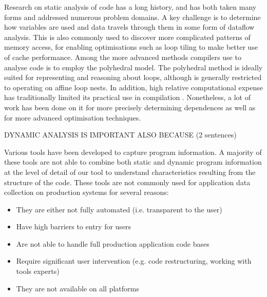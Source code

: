 Research on static analysis of code has a long history, and has both taken many forms and addressed numerous problem domains\cite{Andrade:2012:SAW:2355585.2355593}\cite{1194988}.
A key challenge is to determine how variables are used and data travels through them in some form of dataflow analysis\cite{Feautrier1991}.
This is also commonly used to discover more complicated patterns of memory access, for enabling optimisations such as loop tiling to make better use of cache performance.
Among the more advanced methods compilers use to analyse code is to employ the polyhedral model\cite{Cousot:1978:ADL:512760.512770}\cite{Bagnara:2009:APC:1628316.1628385}\cite{benabderrahmane.10.cc}.
The polyhedral method is ideally suited for representing and reasoning about loops, although is generally restricted to operating on affine loop nests. 
In addition, high relative computational expense has traditionally limited its practical use in compilation \cite{DBLP:journals/entcs/Simon10a}.
Nonetheless, a lot of work has been done on it for more precisely determining dependences \cite{Vasilache:2006:VDA:1183401.1183448} as well as for more advanced optimisation techniques\cite{Nieuwenhuizen2014AutovectorizationUP}\cite{5260526}.

DYNAMIC ANALYSIS IS IMPORTANT ALSO BECAUSE (2 sentences)


Various tools have been developed to capture program information. A majority of these tools are not able to combine both static and dynamic program information at the level of detail of our tool to understand characteristics resulting from the structure of the code. These tools are not commonly used for application data collection on production systems for several reasons:
\begin{itemize}
\item They are either not fully automated (i.e. transparent to the user)
\item Have high barriers to entry for users
\item Are not able to handle full production application code bases
\item Require significant user intervention (e.g. code restructuring, working with tools experts)
\item They are not available on all platforms
\end{itemize}

